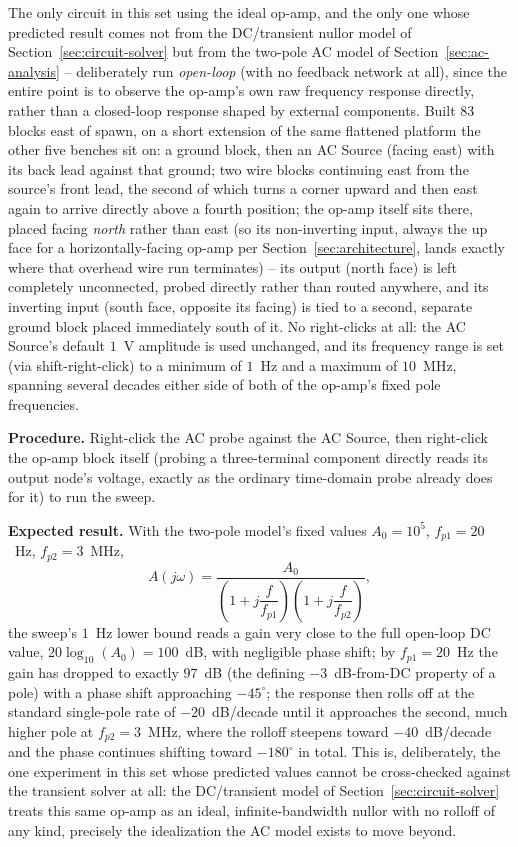 The only circuit in this set using the ideal op-amp, and the only one whose predicted result
comes not from the DC/transient nullor model of Section~\ref{sec:circuit-solver} but from the
two-pole AC model of Section~\ref{sec:ac-analysis} -- deliberately run \emph{open-loop} (with
no feedback network at all), since the entire point is to observe the op-amp's own raw
frequency response directly, rather than a closed-loop response shaped by external
components. Built 83 blocks east of spawn, on a short extension of the same flattened
platform the other five benches sit on: a ground block, then an AC Source (facing east) with
its back lead against that ground; two wire blocks continuing east from the source's front
lead, the second of which turns a corner upward and then east again to arrive directly above
a fourth position; the op-amp itself sits there, placed facing \emph{north} rather than east
(so its non-inverting input, always the up face for a horizontally-facing op-amp per
Section~\ref{sec:architecture}, lands exactly where that overhead wire run terminates) --
its output (north face) is left completely unconnected, probed directly rather than routed
anywhere, and its inverting input (south face, opposite its facing) is tied to a second,
separate ground block placed immediately south of it. No right-clicks at all: the AC
Source's default $1$~V amplitude is used unchanged, and its frequency range is set (via
shift-right-click) to a minimum of $1$~Hz and a maximum of $10$~MHz, spanning several decades
either side of both of the op-amp's fixed pole frequencies.

\textbf{Procedure.} Right-click the AC probe against the AC Source, then right-click the
op-amp block itself (probing a three-terminal component directly reads its output node's
voltage, exactly as the ordinary time-domain probe already does for it) to run the sweep.

\textbf{Expected result.} With the two-pole model's fixed values $A_0 = 10^5$,
$f_{p1} = 20$~Hz, $f_{p2} = 3$~MHz,
\begin{equation}
A(j\omega) = \frac{A_0}{\left(1 + j\dfrac{f}{f_{p1}}\right)\left(1 + j\dfrac{f}{f_{p2}}\right)},
\end{equation}
the sweep's $1$~Hz lower bound reads a gain very close to the full open-loop DC value,
$20\log_{10}(A_0) = 100$~dB, with negligible phase shift; by $f_{p1} = 20$~Hz the gain has
dropped to exactly $97$~dB (the defining $-3$~dB-from-DC property of a pole) with a phase
shift approaching $-45^\circ$; the response then rolls off at the standard single-pole rate
of $-20$~dB/decade until it approaches the second, much higher pole at $f_{p2} = 3$~MHz,
where the rolloff steepens toward $-40$~dB/decade and the phase continues shifting toward
$-180^\circ$ in total. This is, deliberately, the one experiment in this set whose predicted
values cannot be cross-checked against the transient solver at all: the DC/transient model
of Section~\ref{sec:circuit-solver} treats this same op-amp as an ideal, infinite-bandwidth
nullor with no rolloff of any kind, precisely the idealization the AC model exists to move
beyond.
